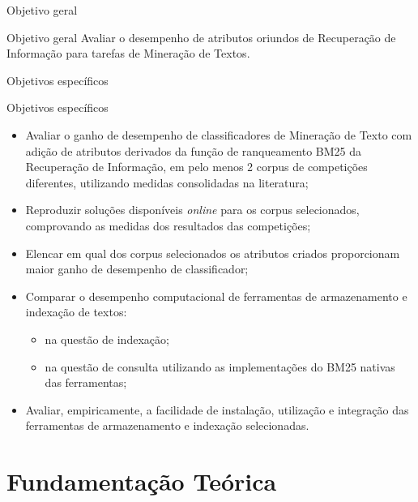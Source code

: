 \documentclass[%
  10pt,%
  aspectratio = 169,%
  compress,%
  t,%
]{beamer}%
\begin{document}
    \begin{frame}{}{Objetivo geral}

        \begin{block}{Objetivo geral}
            Avaliar o desempenho de atributos oriundos de Recuperação de Informação para tarefas de Mineração de Textos.
        \end{block}
    \end{frame}
    
    \begin{frame}{}{Objetivos específicos}
        \begin{block}{Objetivos específicos}
            \begin{itemize}
        	\item Avaliar o ganho de desempenho de classificadores de Mineração de Texto com adição de atributos derivados da função de ranqueamento BM25 da Recuperação de Informação, em pelo menos 2 corpus de competições diferentes, utilizando medidas consolidadas na literatura;
        	
        	\item Reproduzir soluções disponíveis \textit{online} para os corpus selecionados, comprovando as medidas dos resultados das competições;
        	
            \item Elencar em qual dos corpus selecionados os atributos criados proporcionam maior ganho de desempenho de classificador;
            
            \item Comparar o desempenho computacional de ferramentas de armazenamento e indexação de textos:
            \begin{itemize}
                \item na questão de indexação;
                \item na questão de consulta utilizando as implementações do BM25 nativas das ferramentas;
            \end{itemize}
            
            \item Avaliar, empiricamente, a facilidade de instalação, utilização e integração das ferramentas de armazenamento e indexação selecionadas.
            \end{itemize}
        \end{block}
    \end{frame}


\section{Fundamentação Teórica}\label{sec:fundamentação-teórica}
    
\end{document}
